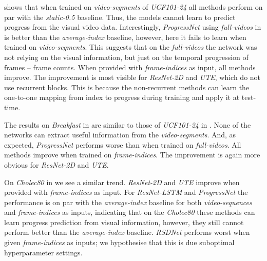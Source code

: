  shows that when trained on \textsl{video-segments} of \textsl{UCF101-24} all methods perform on par with the \textsl{static-0.5} baseline.
Thus, the models cannot learn to predict progress from the visual video data. 
Interestingly, \textsl{ProgressNet} using \textsl{full-videos} in  is better than the \textsl{average-index} baseline, however, here it fails to learn when trained on \textsl{video-segments}. 
This suggests that on the \textsl{full-videos} the network was not relying on the visual information, but just on the temporal progression of frames -- frame counts. 
When provided with \textsl{frame-indices} as input, all methods improve. 
The improvement is most visible for \textsl{ResNet-2D} and \textsl{UTE}, which do not use recurrent blocks. 
This is because the non-recurrent methods can learn the one-to-one mapping from index to progress during training and apply it at test-time. 

The results on \textsl{Breakfast} in  are similar to those of \textsl{UCF101-24} in . 
None of the networks can extract useful information from the \textsl{video-segments}.
And, as expected, \textsl{ProgressNet} performs worse than when trained on \textsl{full-videos}. 
All methods improve when trained on \textsl{frame-indices}.
The improvement is again more obvious for \textsl{ResNet-2D} and \textsl{UTE}.

On \textsl{Cholec80} in  we see a similar trend. 
\textsl{ResNet-2D} and \textsl{UTE} improve when provided with \textsl{frame-indices} as input. 
For \textsl{ResNet-LSTM} and \textsl{ProgressNet} the performance is on par with the \textsl{average-index} baseline for both \textsl{video-sequences} and \textsl{frame-indices} as inputs, indicating that on the \textsl{Cholec80} these methods can learn progress prediction from visual information, however, they still cannot perform better than the \textsl{average-index} baseline. 
\textsl{RSDNet} performs worst when given \textsl{frame-indices} as inputs;  we hypothesise that this is due suboptimal hyperparameter settings. 

